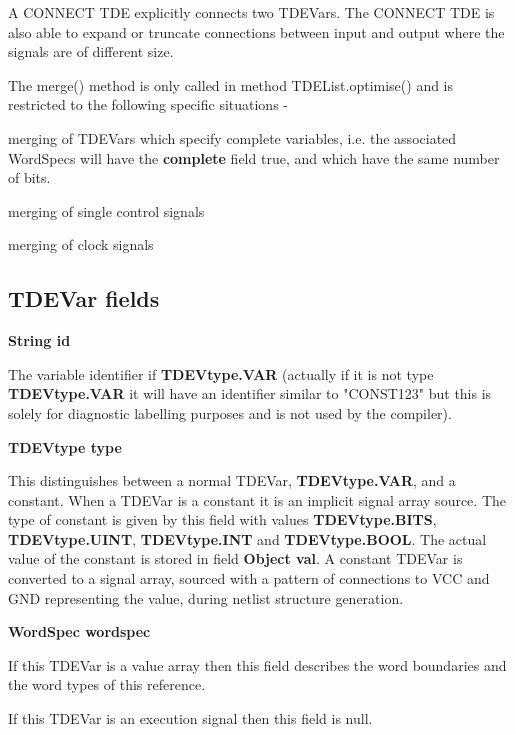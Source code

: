         A CONNECT TDE explicitly connects two TDEVars. The CONNECT TDE is also
        able to expand or truncate connections between input and output where
        the signals are of different size.
        
        The merge() method is only called in method TDEList.optimise() and is
        restricted to the following specific situations -
        \blist
        \item   merging of TDEVars which specify complete variables, i.e.
                the associated WordSpecs will have the {\bf complete}
                field true, and which have the same number of bits.
        \item   merging of single control signals
        \item   merging of clock signals
        \blend


        \subsection{TDEVar fields}


        
            {\bf String id}
            
            The variable identifier if {\bf TDEVtype.VAR} (actually if it is
            not type {\bf TDEVtype.VAR} it will have an identifier similar
            to "CONST123" but this is solely for diagnostic labelling purposes
            and is not used by the compiler).

            {\bf TDEVtype type}
            
            This distinguishes between a normal TDEVar, {\bf TDEVtype.VAR}, and
            a constant. When a TDEVar is a constant it is an implicit signal
            array source. The type of constant is given by this field with
            values {\bf TDEVtype.BITS}, {\bf TDEVtype.UINT}, {\bf TDEVtype.INT}
            and {\bf TDEVtype.BOOL}. The actual value of the constant is stored
            in field {\bf Object val}. A constant TDEVar is converted to a
            signal array, sourced with a pattern of connections to VCC and GND
            representing the value, during netlist structure generation.

            {\bf WordSpec wordspec}
            
            If this TDEVar is a value array then this field describes the
            word boundaries and the word types of this reference.
            
            If this TDEVar is an execution signal then this field is null.


